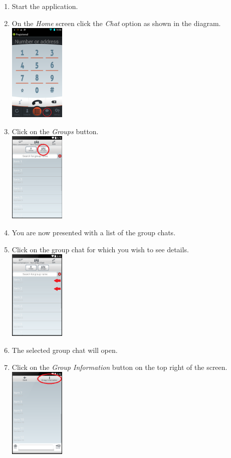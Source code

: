 \documentclass[11pt]{article}
\begin{document}
\begin{enumerate}
\item Start the application.
\item On the \textit{Home} screen click the \textit{Chat} option as shown in the diagram.\\
\includegraphics[width=100px]{images/mainScreen.png}
\item Click on the \textit{Groups} button.\\
\includegraphics[width=100px]{images/ChatlistNav.png}
\item You are now presented with a list of the group chats.
\item Click on the group chat for which you wish to see details.\\
\includegraphics[width=100px]{images/Grouplist.png}
\item The selected group chat will open.
\item Click on the \textit{Group Information} button on the top right of the screen.\\
\includegraphics[width=100px]{images/groupchatInfo.png}

\end{enumerate}
\end{document}
